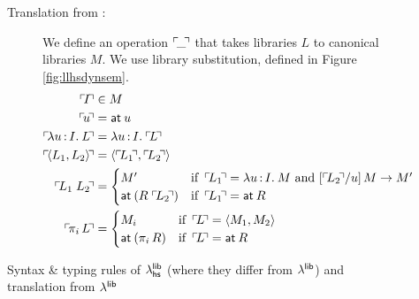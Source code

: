 \documentclass[11pt]{article}
\begin{document}
\begin{figure}
\begin{description}
    \item[Translation from \llib{}:] We define an operation $\ulcorner\!{\_}\!\urcorner$ that
      takes libraries $L$ to canonical libraries $M$. We use library
      substitution, defined in Figure \ref{fig:llhsdynsem}.
      \begin{align*}
        \trans{I} &\in M\\
        \trans{u} &= \at{u}\\
        \trans{\lam{u}{I}{L}} &= \lam{u}{I}{\trans{L}}\\
        \trans{\<L_1, L_2\>} &= \<\trans{L_1}, \trans{L_2}\>\\
        \trans{L_1 \ap L_2} &=
        \begin{cases}
          M' & \text{if }\,\trans{L_1} = \lam{u}{I}{M}
          \text{ and } \sub{\trans{L_2}}{u}{M} \to M'\\
          \at{(R \ap \trans{L_2})} & \text{if }\,\trans{L_1} = \at{R}\\
        \end{cases}\\
        \trans{\proj{i}{L}} &=
        \begin{cases}
          M_i & \text{if }\,\trans{L} = \<M_1, M_2\>\\
          \at{(\proj{i}{R})} & \text{if }\,\trans{L} = \at{R}
        \end{cases}
      \end{align*}

  \end{description}

  \caption{Syntax \& typing rules of $\lambda^{\textsf{lib}}_{\textsf{hs}}$ (where they differ from $\lambda^{\textsf{lib}}$)
    and translation from $\lambda^{\textsf{lib}}$}
  \label{fig:llhs}
\end{figure}
\end{document}
